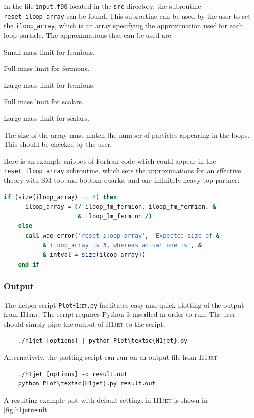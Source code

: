 \documentclass[12pt]{article}
\begin{document}
In the file \texttt{input.f90} located in the \texttt{src}-directory, the subroutine \texttt{reset\_iloop\_array} can be found. This subroutine can be used by the user to set the \texttt{iloop\_array}, which is an array specifying the approximation used for each loop particle. The approximations that can be used are: 
\begin{description}[labelindent=3\parindent, labelwidth =\widthof{\bfseries9999999999999999999}, leftmargin = !] 
	\item[\texttt{iloop\_sm\_fermion}] Small mass limit for fermions. 
	\item[\texttt{iloop\_fm\_fermion}] Full mass limit for fermions. 
	\item[\texttt{iloop\_lm\_fermion}] Large mass limit for fermions. 
	\item[\texttt{iloop\_fm\_scalar}] Full mass limit for scalars. 
	\item[\texttt{iloop\_lm\_scalar}] Large mass limit for scalars. 
\end{description}
The size of the array must match the number of particles appearing in the loops. This should be checked by the user.  

Here is an example snippet of Fortran code which could appear in the \texttt{reset\_iloop\_array} subroutine, which sets the approximations for an effective theory with SM top and bottom quarks, and one infinitely heavy top-partner: 
\begin{lstlisting}[language=Fortran, 
                   keywordstyle=\color{Red},
                   stringstyle=\color{Green},
                   identifierstyle=\color{Blue},
                   showstringspaces=false]
    if (size(iloop_array) == 3) then
      iloop_array = (/ iloop_fm_fermion, iloop_fm_fermion, &
                     & iloop_lm_fermion /)
    else
      call wae_error('reset_iloop_array', 'Expected size of &
           & iloop_array is 3, whereas actual one is', &
           & intval = size(iloop_array))
    end if
\end{lstlisting}

\subsubsection{Output} 

The helper script \texttt{Plot\textsc{H1jet}.py} facilitates easy and
quick plotting of the output from \textsc{H1jet}. The script requires
Python 3 installed in order to run. The user should simply pipe the
output of \textsc{H1jet} to the script:
\begin{lstlisting}
	./h1jet [options] | python Plot\textsc{H1jet}.py 
\end{lstlisting}
Alternatively, the plotting script can run on an output file from \textsc{H1jet}: 
\begin{lstlisting}
	./h1jet [options] -o result.out 
	python Plot\textsc{H1jet}.py result.out 
\end{lstlisting}
A resulting example plot with default settings in \textsc{H1jet} is shown in \autoref{fig:h1jetresult}. 
\end{document}
